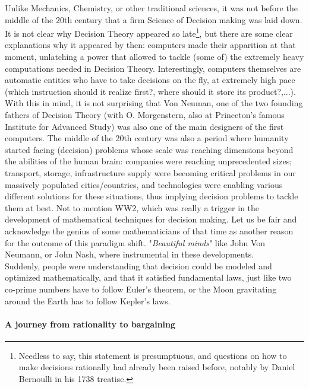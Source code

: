 Unlike Mechanics, Chemistry, or other traditional sciences, it was not before the middle of the 20th century that a firm Science of Decision making was laid down.  It is not clear why Decision Theory appeared so late\footnote{Needless to say, this statement is presumptuous, and questions on how to make decisions rationally had already been raised before, notably by Daniel Bernoulli in his 1738 treatise.}, but there are some clear explanations why it appeared by then: computers made their apparition at that moment, unlatching a power that allowed to tackle (some of) the extremely heavy computations needed in Decision Theory.  Interestingly, computers themselves are automatic entities who have to take decisions on the fly, at extremely high pace (which instruction should it realize first?, where should it store its product?,...).  With this in mind, it is not surprising that Von Neuman, one of the two founding fathers of Decision Theory (with O. Morgenstern, also at Princeton's famous Institute for Advanced Study) was also one of the main designers of the first computers.
The middle of the 20th century was also a period where humanity started facing (decision) problems whose scale was reaching dimensions beyond the abilities of the human brain: companies were reaching unprecedented sizes; transport, storage, infrastructure supply were becoming critical problems in our massively populated cities/countries, and technologies were enabling various different solutions for these situations, thus implying decision problems to tackle them at best.  Not to mention WW2, which was really a trigger in the development of mathematical techniques for decision making. 
Let us be fair and acknowledge the genius of some mathematicians of that time as another reason for the outcome of this paradigm shift. "\emph{Beautiful minds}" like John Von Neumann, or John Nash, where instrumental in these developments.\\
Suddenly, people were understanding that decision could be modeled and optimized mathematically, and that it satisfied fundamental laws, just like two co-prime numbers have to follow Euler's theorem, or the Moon gravitating around the Earth has to follow Kepler's laws.  

\paragraph{A journey from rationality to bargaining}

